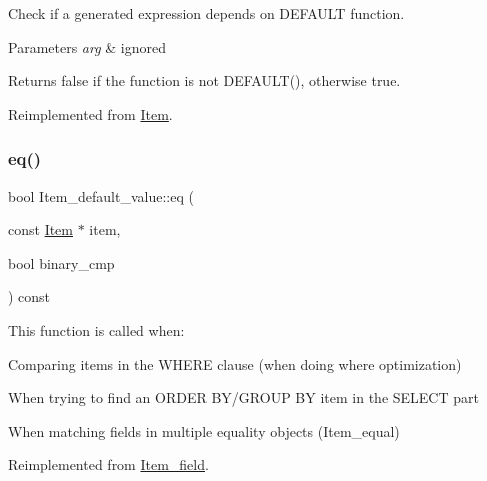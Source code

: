 Check if a generated expression depends on D\+E\+F\+A\+U\+LT function.


\begin{DoxyParams}{Parameters}
{\em arg} & ignored\\
\hline
\end{DoxyParams}
\begin{DoxyReturn}{Returns}
false if the function is not D\+E\+F\+A\+U\+L\+T(), otherwise true. 
\end{DoxyReturn}


Reimplemented from \mbox{\hyperlink{classItem_a16558f8205877603fbc942dcd880c673}{Item}}.

\mbox{\label{classItem__default__value_a2be2ba1ab394829380e6f0525f9f5d07}} 
\subsubsection{\texorpdfstring{eq()}{eq()}}
{\footnotesize\ttfamily bool Item\+\_\+default\+\_\+value\+::eq (\begin{DoxyParamCaption}\item[{const \mbox{\hyperlink{classItem}{Item}} $\ast$}]{item,  }\item[{bool}]{binary\+\_\+cmp }\end{DoxyParamCaption}) const\hspace{0.3cm}{\ttfamily [virtual]}}

This function is called when\+:
\begin{DoxyItemize}
\item Comparing items in the W\+H\+E\+RE clause (when doing where optimization)
\item When trying to find an O\+R\+D\+ER B\+Y/\+G\+R\+O\+UP BY item in the S\+E\+L\+E\+CT part
\item When matching fields in multiple equality objects (Item\+\_\+equal) 
\end{DoxyItemize}

Reimplemented from \mbox{\hyperlink{classItem__field_a009fb19dc742f706ec5c8bad9a6a0c2d}{Item\+\_\+field}}.

\mbox{\label{classItem__default__value_a49d46d9f91ce74c6b5a33c199ccdc774}} 

